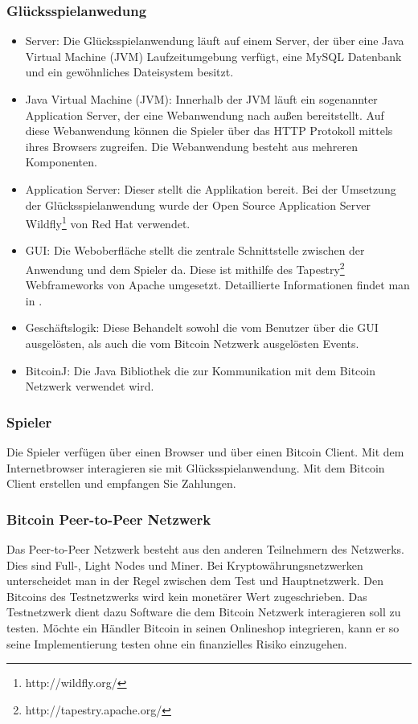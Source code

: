 \subsubsection{Glücksspielanwedung}
\begin{itemize}
\item Server: Die Glücksspielanwendung läuft auf einem Server, der über eine Java Virtual Machine (JVM) Laufzeitumgebung verfügt, eine MySQL Datenbank und ein gewöhnliches Dateisystem besitzt.
\item Java Virtual Machine (JVM): Innerhalb der JVM läuft ein sogenannter Application Server, der eine Webanwendung nach außen bereitstellt. Auf diese Webanwendung können die Spieler über das HTTP Protokoll mittels ihres Browsers zugreifen. Die Webanwendung besteht aus mehreren Komponenten.
\item Application Server: Dieser stellt die Applikation bereit. Bei der Umsetzung der Glücksspielanwendung wurde der Open Source Application Server Wildfly\footnote{http://wildfly.org/} von Red Hat verwendet.
\item GUI: Die Weboberfläche stellt die zentrale Schnittstelle zwischen der Anwendung und dem Spieler da. Diese ist mithilfe des Tapestry\footnote{http://tapestry.apache.org/} Webframeworks von Apache umgesetzt. Detaillierte Informationen findet man in \citep{tapestry}.
\item Geschäftslogik: Diese Behandelt sowohl die vom Benutzer über die GUI ausgelösten, als auch die vom Bitcoin Netzwerk ausgelösten Events.
\item BitcoinJ: Die Java Bibliothek die zur Kommunikation mit dem Bitcoin Netzwerk verwendet wird.
\end{itemize}

\subsubsection{Spieler}
Die Spieler verfügen über einen Browser und über einen Bitcoin Client.
Mit dem Internetbrowser interagieren sie mit Glücksspielanwendung. Mit dem Bitcoin Client erstellen und empfangen Sie Zahlungen.
\subsubsection{Bitcoin Peer-to-Peer Netzwerk}
Das Peer-to-Peer Netzwerk besteht aus den anderen Teilnehmern des Netzwerks. Dies sind Full-, Light Nodes und Miner. Bei Kryptowährungsnetzwerken unterscheidet man in der Regel zwischen dem Test und Hauptnetzwerk. Den Bitcoins des Testnetzwerks wird kein monetärer Wert zugeschrieben. Das Testnetzwerk dient dazu Software die dem Bitcoin Netzwerk interagieren soll zu testen. Möchte ein Händler Bitcoin in seinen Onlineshop integrieren, kann er so seine Implementierung testen ohne ein finanzielles Risiko einzugehen. 

